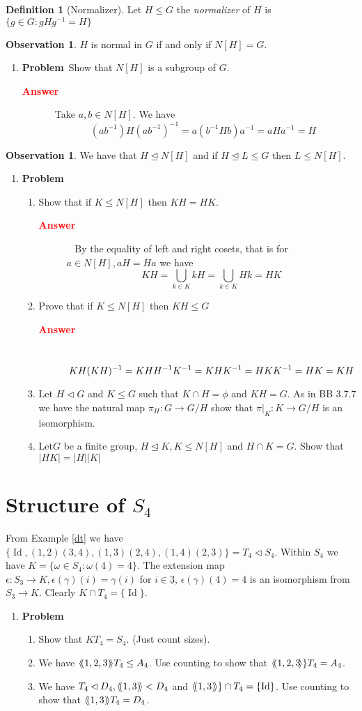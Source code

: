 \documentclass[12pt]{amsart}
\newcommand{\benu}{\begin{enumerate}}
\newcommand{\eenu}{\end{enumerate}}
\theoremstyle{definition}
\newtheorem{observation}[theorem]{Observation}
\newcommand{\bo}{\begin{observation}}
\newcommand{\eo}{\end{observation}}
\newtheorem{definition}[theorem]{Definition}
\newcommand{\bdf}{\begin{definition}}
\newcommand{\edf}{\end{definition}}
\newcommand{\un}[1]{\underline{#1}}
\newcommand{\ep}{\epsilon}
\DeclareMathOperator{\Id}{Id}
\newcommand{\nts}{\negthinspace}
\newcommand{\itep}{\item {\bfseries Problem}\ }
\newcommand{\gen}[1]{\langle \nts#1 \nts\rangle}
\newcommand{\beans}{\begin{description} \item[{ \bfseries \textcolor{red}{Answer}}]\ }
\newcommand{\eans }{\end{description}}
\begin{document}
\bdf[Normalizer] Let $H\leq G$ the {\em normalizer} of $H$ is $\{g\in G:gHg^{-1}=H\}$\edf
\bo $H$ is normal in $G$ if and only if $N[H]=G$.
\eo 
\begin{enumerate}[resume=p]
\itep Show that $N[H]$ is a subgroup of $G$.
\beans Take $a, b\in N[H]$. We have 
\[(ab^{-1})H(ab^{-1})^{-1}=a(b^{-1}Hb)a^{-1}=aHa^{-1}=H\]
\eans
\end{enumerate}
\bo We have that $H\unlhd N[H]$ and if $H\unlhd L\leq G$ then $L\leq N[H]$. 
\eo
\begin{enumerate}[resume=p]
\itep 
\benu  
\item Show that if $K\leq N[H]$ then $KH=HK$.
\beans
By the equality of left and right cosets, that is for $a\in N[H],aH=Ha$ we have 
\[KH=\bigcup_{k\in K}kH=\bigcup_{k\in K}Hk=HK
\]

\eans
\item Prove that if $K\leq N[H]$ then $KH\leq G$
\beans
\[ KH(KH)^{-1}=KHH^{-1}K^{-1}\\=KHK^{-1}=HKK^{-1}=HK=KH
\]
\eans
\item\label{quotiso} Let $H\lhd G$ and $K\leq G$ such that $K\cap H=\phi$ and $KH=G$. As in BB 3.7.7 we have the natural map $\pi_H\colon G\to G/H$ show that $\pi|_K\colon K\to G/H$ is an isomorphism.
\item \label{count} Let$G$ be a finite group, $H\unlhd K,K\leq N[H]$ and $H\cap K=G$. Show that $|HK|=|H||K|$
\eenu
\end{enumerate}
\section{Structure of $S_4$}
From Example \ref{dt} we have $\{\Id,(1,2)(3,4),(1,3)(2,4),(1,4)(2,3)\}=T_4\lhd S_4$. Within $S_4$ we have $K=\{\omega\in S_4:\omega(4)=4\}$. The extension map $\epsilon\colon S_3\to K,\ep(\gamma)(i)=\gamma(i)$ for $i\in \un{3}$, $\epsilon(\gamma)(4)=4$ is an isomorphism from $S_3\to K$. Clearly $K\cap T_4=\{\Id\}$. 
\begin{enumerate}[resume=p]
\itep
\benu
\item Show that $KT_4=S_4$. (Just count sizes).
\item We have $\gen{(1,2,3)}T_4\leq A_4$. Use counting  to show that $\gen{(1,2,3}\}T_4=A_4$.


\item We have $T_4\lhd D_4, \gen{(1,3)}<D_4$ and $\gen{(1,3)}\}\cap T_4=\{\Id\}$. Use counting to show that $\gen{(1,3)}T_4=D_4$.
\eenu
\end{enumerate}
\end{document}
